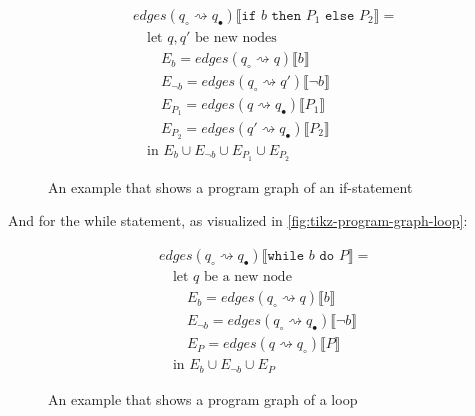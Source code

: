 \begin{equation}
    \begin{split}
        &edges(q_\circ \rightsquigarrow q_\bullet) \lBrack \texttt{if } b \texttt{ then } P_1 \texttt{ else } P_2 \rBrack = \\
        &\quad \text{let } q, q' \text{ be new nodes} \\
        &\quad\quad E_{b} = edges(q_\circ \rightsquigarrow q) \lBrack b \rBrack \\
        &\quad\quad E_{\neg b} = edges(q_\circ \rightsquigarrow q') \lBrack \neg b \rBrack \\
        &\quad\quad E_{P_1}= edges(q \rightsquigarrow q_\bullet) \lBrack P_1 \rBrack \\
        &\quad\quad E_{P_2}= edges(q' \rightsquigarrow q_\bullet) \lBrack P_2 \rBrack \\
        &\quad \text{in } E_{b} \cup E_{\neg b} \cup E_{P_1} \cup E_{P_2}
    \end{split}\label{eq:equation8}
\end{equation}

\begin{figure}[htb!]
    \center
    
    \caption{An example that shows a program graph of an if-statement}
    \label{fig:tikz-program-graph-if}
\end{figure}

And for the while statement, as visualized in \autoref{fig:tikz-program-graph-loop}:

\begin{equation}
    \begin{split}
        &edges(q_\circ \rightsquigarrow q_\bullet) \lBrack \texttt{while } b \texttt{ do } P \rBrack = \\
        &\quad \text{let } q \text{ be a new node} \\
        &\quad\quad E_{b} = edges(q_\circ \rightsquigarrow q) \lBrack b \rBrack \\
        &\quad\quad E_{\neg b} = edges(q_\circ \rightsquigarrow q_\bullet) \lBrack \neg b \rBrack \\
        &\quad\quad E_{P} = edges(q \rightsquigarrow q_\circ) \lBrack P \rBrack \\
        &\quad \text{in } E_{b} \cup E_{\neg b} \cup E_{P}
    \end{split}\label{eq:equation9}
\end{equation}

\begin{figure}[htb!]
    \center
    
    \caption{An example that shows a program graph of a loop}
    \label{fig:tikz-program-graph-loop}
\end{figure}

